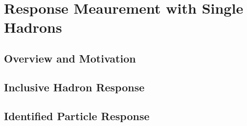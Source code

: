 \chapter{Response Meaurement with Single Hadrons}

\label{ch:singlehadrons}

\section{Overview and Motivation}


\section{Inclusive Hadron Response}


\section{Identified Particle Response}

